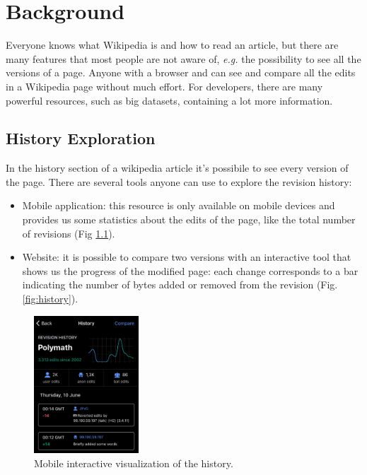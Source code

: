 \chapter{Background}
Everyone knows what Wikipedia is and how to read an article, but there are many features
that most people are not aware of, \textit{e.g.} the possibility to see all the versions of a page. 
Anyone with a browser and can see and compare all the edits in a
Wikipedia page without much effort. For developers, there are many powerful resources, such as big datasets,
containing a lot more information.  

\section{History Exploration}
In the history section of a wikipedia article it's possibile to see every version of the page.
There are several tools anyone can use to explore the revision history: 


\begin{itemize}
    \item Mobile application: this resource is only available on mobile devices and provides us
        some statistics about the edits of the page, like the total number of revisions (Fig \ref{fig:mobilehistory}). 
    \item Website: it is possible to compare two versions with an interactive tool that shows us
        the progress of the modified page: each change corresponds to a bar indicating the number of
        bytes added or removed from the revision (Fig. \ref{fig:history}).
\end{itemize}

\begin{figure}[H]
    \centering
    \includegraphics[width=0.35\textwidth]{./chapters/02/assets/mobile_history.jpg}
    \caption{Mobile interactive visualization of the history.}
    \label{fig:mobilehistory}
\end{figure}

